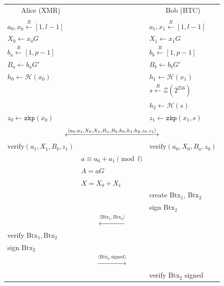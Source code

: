 \documentclass{llncs}
\renewcommand{\arraystretch}{1.5}
\begin{document}
\begin{figure}[H]
    \begin{table}[H]
      \centering
      {\renewcommand{\arraystretch}{1.2}%
      \begin{tabular}{ | l l l | }
        \hline
          \multicolumn{1}{|c}{Alice (XMR)} &  & \multicolumn{1}{c|}{Bob (BTC)} \\
          & & \\
          $a_0, x_0 \xleftarrow{R} [1, l-1]$ & & $a_1, x_1 \xleftarrow{R} [1, l-1]$ \\
          $X_0 \leftarrow x_0G$ & & $X_1 \leftarrow x_1G$ \\
          $b_a \xleftarrow{R} [1, p-1]$ & & $b_b \xleftarrow{R} [1, p-1]$ \\
          $B_a \leftarrow b_aG'$ & & $B_b \leftarrow b_bG'$ \\
          $h_0 \leftarrow \mathcal{H}(x_0)$ & & $h_1 \leftarrow \mathcal{H}(x_1)$ \\
          & & $s \xleftarrow{R} \mathcal{Z}(2^{256})$ \\
          & & $h_2 \leftarrow \mathcal{H}(s)$ \\
          $z_0 \leftarrow \texttt{zkp}(x_0)$ & & $z_1 \leftarrow \texttt{zkp}(x_1, s)$ \\
           & & \\
          \multicolumn{3}{|c|}{$\xlongleftrightarrow{\langle a_0, a_1, X_0, X_1, B_a, B_b, h_0, h_1, h_2, z_0, z_1 \rangle}$} \\
          $\text{verify}(a_1, X_1, B_b, z_1)$ & & $\text{verify}(a_0, X_0, B_a, z_0)$ \\
          & $a \equiv a_0 + a_1 \pmod l$ & \\
          & $A = aG$ & \\
          & $X = X_0 + X_1$ & \\
          & & create $\text{Btx}_1$, $\text{Btx}_2$ \\
          & & sign $\text{Btx}_2$ \\
          \multicolumn{3}{|c|}{$\xleftarrow{\langle \text{Btx}_1, \text{Btx}_2 \rangle}$} \\
          verify $\text{Btx}_1, \text{Btx}_2$ & & \\
          sign $\text{Btx}_2$ & & \\
          \multicolumn{3}{|c|}{$\xrightarrow{\langle \text{Btx}_2 \text{ signed} \rangle}$} \\
          & & verify $\text{Btx}_2$ signed \\

\end{tabular}}
\end{table}
\end{figure}
\end{document}
